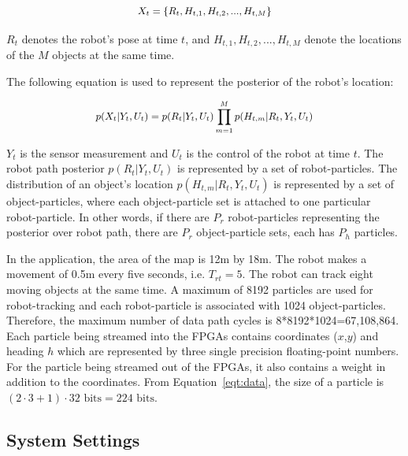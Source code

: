 \begin{equation}
\small
\begin{aligned}
X_t = \{R_t, H_{t,1}, H_{t,2}, ..., H_{t,M}\}
\end{aligned}
\end{equation}

$R_t$ denotes the robot's pose at time $t$, and $H_{t,1}, H_{t,2}, ..., H_{t,M}$ denote the locations of the $M$ objects at the same time.

The following equation is used to represent the posterior of the robot's location:

\begin{equation}
\small
\begin{aligned}
p(X_t|Y_t,U_t) = p(R_t|Y_t,U_t) \prod_{m=1}^M p(H_{t,m}|R_t,Y_t,U_t)
\end{aligned}
\end{equation}

$Y_t$ is the sensor measurement and $U_t$ is the control of the robot at time $t$.
The robot path posterior $p(R_t|Y_t,U_t)$ is represented by a set of robot-particles.
The distribution of an object's location $p(H_{t,m}|R_t,Y_t,U_t)$ is represented by a set of object-particles, where each object-particle set is attached to one particular robot-particle.
In other words, if there are $P_r$ robot-particles representing the posterior over robot path, there are $P_r$ object-particle sets, each has $P_h$ particles.

In the application, the area of the map is 12m by 18m.
The robot makes a movement of 0.5m every five seconds, i.e. $T_{rt} = 5$.
The robot can track eight moving objects at the same time.
A maximum of 8192 particles are used for robot-tracking and each robot-particle is associated with 1024 object-particles.
Therefore, the maximum number of data path cycles is 8*8192*1024=67,108,864.
Each particle being streamed into the FPGAs contains coordinates ($x$,$y$) and heading $h$ which are represented by three single precision floating-point numbers.
For the particle being streamed out of the FPGAs, it also contains a weight in addition to the coordinates.
From Equation~\ref{eqt:data}, the size of a particle is $(2 \cdot 3 + 1) \cdot 32 \mbox{ bits} = 224 \mbox{ bits}$.

\subsection{System Settings}

